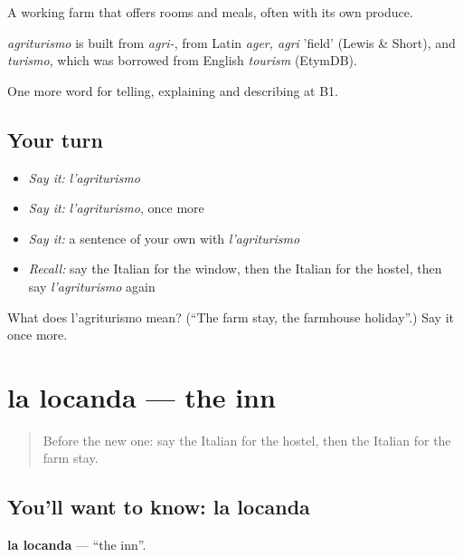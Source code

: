 A working farm that offers rooms and meals, often with its own produce.

\begin{cousinweb}
\emph{agriturismo} is built from \emph{agri-}, from Latin \emph{ager, agri} 'field' (Lewis \& Short), and \emph{turismo}, which was borrowed from English \emph{tourism} (EtymDB).
\end{cousinweb}

\begin{grammarlens}[title={What you've built}]
One more word for telling, explaining and describing at B1.
\end{grammarlens}

\subsection*{Your turn}
\begin{itemize}
\raggedright
  \item \emph{Say it:} \emph{l'agriturismo}
  \item \emph{Say it:} \emph{l'agriturismo}, once more
  \item \emph{Say it:} a sentence of your own with \emph{l'agriturismo}
  \item \emph{Recall:} say the Italian for the window, then the Italian for the hostel, then say \emph{l'agriturismo} again
\end{itemize}

\begin{tcolorbox}[breakable,colback=teal!4,colframe=teal!35!black,title={Before you move on}]
What does l'agriturismo mean? (\textquotedblleft{}The farm stay, the farmhouse holiday\textquotedblright{}.) Say it once more.
\end{tcolorbox}
\section[la locanda]{la locanda — the inn}

\label{lesson:IT-C429-locanda}



\begin{quote}
Before the new one: say the Italian for the hostel, then the Italian for the farm stay.
\end{quote}

\subsection*{You'll want to know: la locanda}
\textbf{la locanda} — \textquotedblleft{}the inn\textquotedblright{}.

